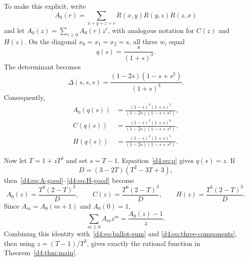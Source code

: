 To make this explicit, write
\[
 A_0(r)=\sum_{x+y+z=r}R(x,y)R(y,z)R(z,x)
\]
and let $A_0(z)=\sum_{r\ge0}A_0(r)z^r$, with analogous notation for
$C(z)$ and $H(z)$.  On the diagonal $x_0=x_1=x_2=s$, all three $w_i$ equal
\begin{equation}\label{d4:eq:q}
 q(s)=\frac{s}{(1+s)^3}.
\end{equation}
The determinant becomes
\begin{equation}\label{d4:eq:diag-delta}
 \Delta(s,s,s)=
 \frac{(1-2s)(1-s+s^2)}{(1+s)^3}.
\end{equation}
Consequently,
\begin{align}
 A_0(q(s))&=\frac{(1-s)^3(1+s)^3}
 {(1-2s)(1-s+s^2)},\label{d4:eq:A-good}\\
 C(q(s))&=\frac{(1-s)^3(1+s)^6}
 {(1-2s)(1-s+s^2)},\label{d4:eq:C-good}\\
 H(q(s))&=\frac{(1-s)^3(1+s)^5}
 {(1-2s)(1-s+s^2)}.\label{d4:eq:H-good}
\end{align}

Now let $T=1+zT^3$ and set $s=T-1$.  Equation~\eqref{d4:eq:q} gives
$q(s)=z$.  If
\[
 D=(3-2T)(T^2-3T+3),
\]
then~\eqref{d4:eq:A-good}--\eqref{d4:eq:H-good} become
\begin{equation}\label{d4:eq:three-components}
 A_0(z)=\frac{T^3(2-T)^3}{D},\qquad
 C(z)=\frac{T^6(2-T)^3}{D},\qquad
 H(z)=\frac{T^5(2-T)^3}{D}.
\end{equation}
Since $A_m=A_0(m+1)$ and $A_0(0)=1$,
\[
 \sum_{m\ge0}A_mz^m=\frac{A_0(z)-1}{z}.
\]
Combining this identity with~\eqref{d4:eq:ballot-sum} and
\eqref{d4:eq:three-components}, then using $z=(T-1)/T^3$, gives exactly the
rational function in Theorem~\ref{d4:thm:main}.
